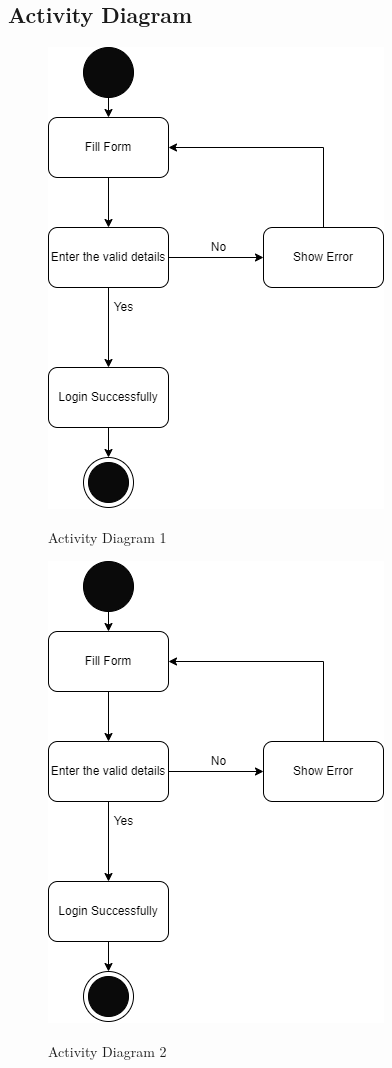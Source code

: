 \subsection{Activity Diagram}

\begin{figure}[H]
    \centering
    \caption{Activity Diagram 1}
    \includegraphics[scale=0.5]{./diagrams/Activity Diagram/ad-01.png}
    \label{fig:act-01}

\end{figure}


\begin{figure}[H]
    \centering
    \caption{Activity Diagram 2}
    \includegraphics[scale=0.5]{./diagrams/Activity Diagram/ad-02.png}
    \label{fig:act-02}

\end{figure}


